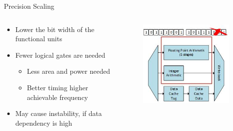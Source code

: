 \documentclass{beamer}
\begin{document}
\begin{frame}{Precision Scaling}
\begin{columns}
\begin{column}{0.5\textwidth}
    \begin{itemize}
        \item<1->Lower the bit width of the functional units
        \item<2->Fewer logical gates are needed
            \begin{itemize}
                    \item<3-> Less area and power needed
                    \item<4-> Better timing higher achievable frequency
            \end{itemize}
        \item<5->May cause instability, if data dependency is high
    \end{itemize}
\end{column}
\begin{column}{0.5\textwidth}
    \begin{figure}
     \includegraphics[width=\textwidth]{img/precisionReduction.jpg}
    \end{figure}

 \end{column}
\end{columns}
\end{frame}
\end{document}
